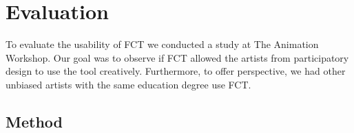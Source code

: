 \section{Evaluation}


To evaluate the usability of FCT we conducted a study at The Animation Workshop. Our goal was to observe if FCT allowed the artists from participatory design to use the tool creatively. Furthermore, to offer perspective, we had other unbiased artists with the same education degree use FCT.


\subsection{Method} \label{method}







